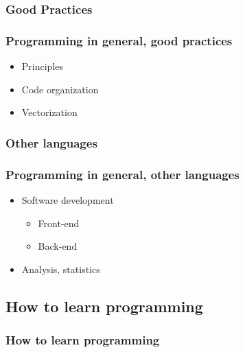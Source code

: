 \subsubsection{Good Practices}

\begin{frame}\frametitle{Programming in general, good practices}

   \begin{itemize}
      \item Principles
      \item Code organization
      \item Vectorization
   \end{itemize}

\end{frame}


\subsubsection{Other languages}

\begin{frame}\frametitle{Programming in general, other languages}

   \begin{itemize}
      \item Software development
      \begin{itemize}
         \item Front-end
         \item Back-end
      \end{itemize}
      \item Analysis, statistics
   \end{itemize}

\end{frame}

\subsection{How to learn programming}

\begin{frame}\frametitle{How to learn programming}

\end{frame}




